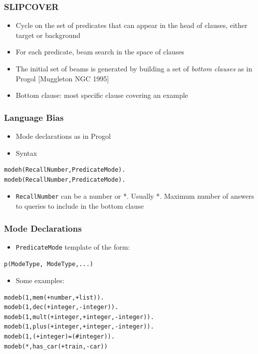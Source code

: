 \documentclass[trans,aspectratio=1610]{beamer}
\begin{document}
\begin{frame}
\frametitle{SLIPCOVER}

	\begin{itemize}



\item  Cycle on the set of predicates that can appear in the head of clauses, either target or background
\item For each predicate, beam search in the space of clauses
\item
The initial set of beams  is  generated   by building a set of \emph{bottom clauses} as in Progol [Muggleton NGC 1995]
\item Bottom clause: most specific clause covering an example
\end{itemize}
\end{frame}
\begin{frame}[fragile]
\frametitle{Language Bias}
\begin{itemize}
\item Mode declarations as in Progol
\item Syntax
\end{itemize}
\begin{verbatim}
modeh(RecallNumber,PredicateMode).
modeb(RecallNumber,PredicateMode).
\end{verbatim}
\begin{itemize}
\item
\verb|RecallNumber| can be a number or *. Usually *. Maximum number of answers to queries to include in the bottom clause
\end{itemize}
\end{frame}
\begin{frame}[fragile]
\frametitle{Mode Declarations}
\begin{itemize}
\item 
\verb|PredicateMode| template of the form:
\end{itemize}
\begin{verbatim}
p(ModeType, ModeType,...)
\end{verbatim}
\begin{itemize}
\item
Some examples:
\end{itemize}
\begin{verbatim}
modeb(1,mem(+number,+list)).
modeb(1,dec(+integer,-integer)).
modeb(1,mult(+integer,+integer,-integer)).
modeb(1,plus(+integer,+integer,-integer)).
modeb(1,(+integer)=(#integer)).
modeb(*,has_car(+train,-car))
\end{verbatim}
\end{frame}
\end{document}
